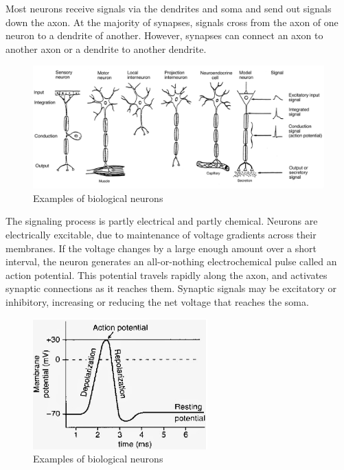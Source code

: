 Most neurons receive signals via the dendrites and soma and send out signals down the axon.
At the majority of synapses, signals cross from the axon of one neuron to a dendrite of another.
However, synapses can connect an axon to another axon or a dendrite to another dendrite.
\begin{figure}[htb] 
	\label{fig:neurons}
	\centering
	\includegraphics[width=\textwidth]{figures/bio_neurons}
	\caption{Examples of biological neurons}
\end{figure}

The signaling process is partly electrical and partly chemical. Neurons are electrically 
excitable, due to maintenance of voltage gradients across their membranes. 
If the voltage changes by a large enough amount over a short interval, 
the neuron generates an all-or-nothing electrochemical pulse called an action potential. 
This potential travels rapidly along the axon, and activates synaptic connections as it 
reaches them. Synaptic signals may be excitatory or inhibitory, 
increasing or reducing the net voltage that reaches the soma.
\begin{figure}[htb] 
	\label{fig:bio_activation}
	\centering
	\includegraphics[width=0.6\textwidth]{figures/bio_activation}
	\caption{Examples of biological neurons}
\end{figure}

